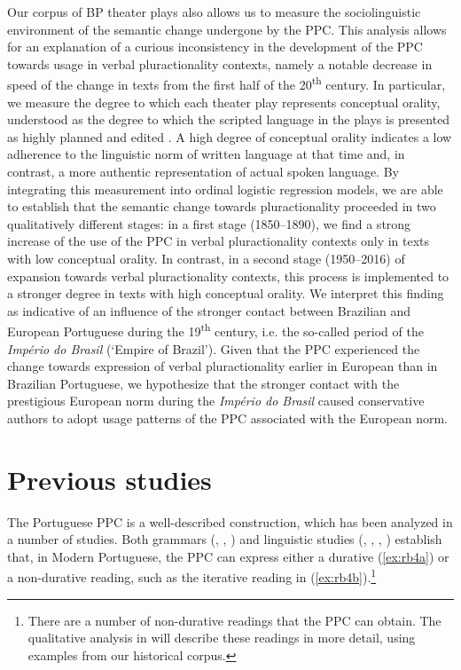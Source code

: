 \documentclass[output=paper,colorlinks,citecolor=brown]{langscibook}
\begin{document}
Our corpus of BP theater plays also allows us to measure the sociolinguistic environment of the semantic change undergone by the PPC. This analysis allows for an explanation of a curious inconsistency in the development of the PPC towards usage in verbal pluractionality contexts, namely a notable decrease in speed of the change in texts from the first half of the 20\textsuperscript{th} century. In particular, we measure the degree to which each theater play represents conceptual orality, understood as the degree to which the scripted language in the plays is presented as highly planned and edited \parencite{KochOesterreicher1985}. A high degree of conceptual orality indicates a low adherence to the linguistic norm of written language at that time and, in contrast, a more authentic representation of actual spoken language. By integrating this measurement into ordinal logistic regression models, we are able to establish that the semantic change towards pluractionality proceeded in two qualitatively different stages: in a first stage (1850--1890), we find a strong increase of the use of the PPC in verbal pluractionality contexts only in texts with low conceptual orality. In contrast, in a second stage (1950--2016) of expansion towards verbal pluractionality contexts, this process is implemented to a stronger degree in texts with high conceptual orality. We interpret this finding as indicative of an influence of the stronger contact between Brazilian and European Portuguese during the 19\textsuperscript{th} century, i.e. the so-called period of the \textit{Império do Brasil} (‘Empire of Brazil’). Given that the PPC experienced the change towards expression of verbal pluractionality earlier in European than in Brazilian Portuguese, we hypothesize that the stronger contact with the prestigious European norm during the \textit{Império do Brasil} caused conservative authors to adopt usage patterns of the PPC associated with the European norm.

\section{Previous studies}\label{sec:rb2}
The Portuguese PPC is a well-described construction, which has been analyzed in a number of studies. Both grammars (\cite[180]{Hundertmark-SantosMartins1982}, \cite[23]{Gärtner1998}, \cite[249--250]{Perini2002}) and linguistic studies (\cite[127]{Boléo1936}, \cite[66]{Ilari2001a}, \cite{NovaesNespoli2014}, \cite{Santos2008}) establish that, in Modern Portuguese, the PPC can express either a durative (\ref{ex:rb4a}) or a non-durative reading, such as the iterative reading in (\ref{ex:rb4b}).\footnote{There are a number of non-durative readings that the PPC can obtain. The qualitative analysis in  will describe these readings in more detail, using examples from our historical corpus.}
\end{document}
